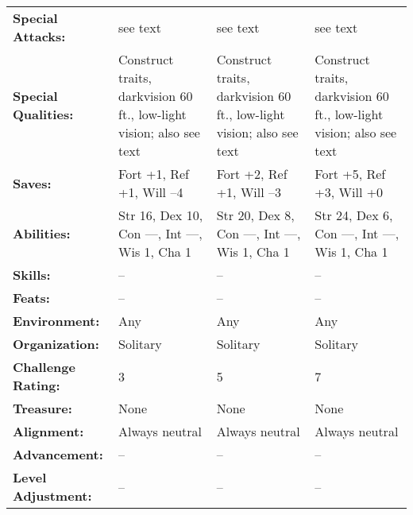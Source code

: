 \documentclass[../main.tex]{subfiles}
\begin{document}
\begin{table*}[t]
\begin{tabular}{p{9em}p{11em}p{11em}p{13em}}
\rowcolor[HTML]{FFCE93}
\textbf{Special Attacks:} & see text & see text & see text \\
\textbf{Special Qualities:} & Construct traits, darkvision 60 ft., low-light vision; also see text & Construct traits, darkvision 60 ft., low-light vision; also see text & Construct traits, darkvision 60 ft., low-light vision; also see text \\
\rowcolor[HTML]{FFCE93}
\textbf{Saves:} & Fort +1, Ref +1, Will –4 & Fort +2, Ref +1, Will –3 & Fort +5, Ref +3, Will +0 \\
\textbf{Abilities:} & Str 16, Dex 10, Con —, Int —, Wis 1, Cha 1 & Str 20, Dex 8, Con —, Int —, Wis 1, Cha 1 & Str 24, Dex 6, Con —, Int —, Wis 1, Cha 1 \\
\rowcolor[HTML]{FFCE93}
\textbf{Skills:} & -- & -- & -- \\
\textbf{Feats:} & -- & -- & -- \\
\rowcolor[HTML]{FFCE93}
\textbf{Environment:} & Any & Any & Any \\
\textbf{Organization:} & Solitary & Solitary & Solitary \\
\rowcolor[HTML]{FFCE93}
\textbf{Challenge Rating:} & 3 & 5 & 7 \\
\textbf{Treasure:} & None & None & None \\
\rowcolor[HTML]{FFCE93}
\textbf{Alignment:} & Always neutral & Always neutral & Always neutral \\
\textbf{Advancement:} & -- & -- & -- \\
\rowcolor[HTML]{FFCE93}
\textbf{Level Adjustment:} & -- & -- & --
\end{tabular}
\end{table*}
\clearpage
\end{document}

